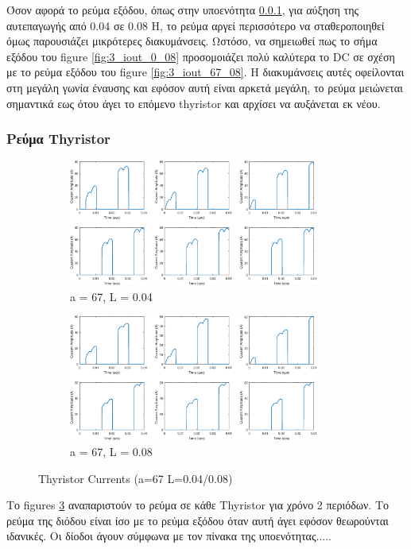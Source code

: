 Όσον αφορά το ρεύμα εξόδου, όπως στην υποενότητα \ref{}, για αύξηση της αυτεπαγωγής από 0.04 σε 0.08 H, το ρεύμα αργεί περισσότερο να σταθεροποιηθεί όμως παρουσιάζει μικρότερες διακυμάνσεις. Ωστόσο, να σημειωθεί πως το σήμα εξόδου του figure \ref{fig:3_iout_0_08}  προσομοιάζει πολύ καλύτερα το DC σε σχέση με το ρεύμα εξόδου του figure \ref{fig:3_iout_67_08}. Η διακυμάνσεις αυτές οφείλονται στη μεγάλη γωνία έναυσης και εφόσον αυτή είναι αρκετά μεγάλη, το ρεύμα μειώνεται σημαντικά εως ότου άγει το επόμενο thyristor και αρχίσει να αυξάνεται εκ νέου. 
\clearpage

\subsubsection{Ρεύμα Thyristor}
\begin{figure}[h]
	\centering
	\begin{subfigure}{.5\textwidth}
		\centering
		\includegraphics[width =0.9\textwidth]{Images/3_ThI_67_04}
		\caption{a = 67, L = 0.04}
		\label{fig:3_ThI_67_04}
	\end{subfigure}%
	\begin{subfigure}{.5\textwidth}
		\centering
		\includegraphics[width = 0.9\textwidth]{Images/3_ThI_67_08}
		\caption{a = 67, L = 0.08}
		\label{fig:3_ThI_67_08}
	\end{subfigure}
	\caption{Thyristor Currents (a=67 L=0.04/0.08)}
	\label{figs:3_ThI_67}
\end{figure}
Το figures \ref{figs:3_ThI_67} αναπαριστούν το ρεύμα σε κάθε Thyristor για χρόνο 2 περιόδων. Το ρεύμα της διόδου είναι ίσο με το ρεύμα εξόδου όταν αυτή άγει εφόσον θεωρούνται ιδανικές. Οι δίοδοι άγουν σύμφωνα με τον πίνακα της υποενότητας.....
